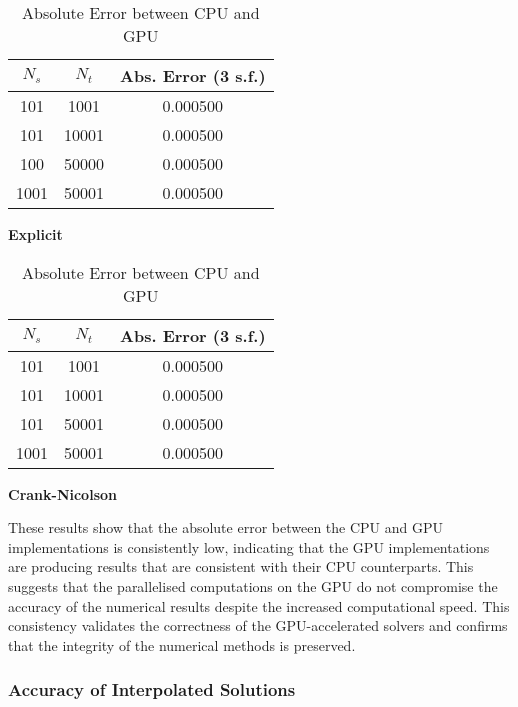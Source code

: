 \begin{table}[H]
    \centering
    \begin{minipage}{0.48\textwidth}
        \centering
        \begin{tabular}{ |c|c|c| }
            \hline
            \textbf{$N_s$} & \textbf{$N_t$} & \textbf{Abs. Error (3 s.f.)} \\ \hline
            101 & 1001 & 0.000500 \\ \hline
            101 & 10001 & 0.000500 \\ \hline
            100 & 50000 & 0.000500 \\ \hline
            1001 & 50001 & 0.000500 \\ \hline
        \end{tabular}
        \caption{\textbf{Explicit}}
        \label{tab:comparison-cpu-gpu-explicit}
    \end{minipage}
    \hfill
    \begin{minipage}{0.48\textwidth}
        \centering
        \begin{tabular}{ |c|c|c| }
            \hline
            \textbf{$N_s$} & \textbf{$N_t$} & \textbf{Abs. Error (3 s.f.)} \\ \hline
            101 & 1001 & 0.000500 \\ \hline
            101 & 10001 & 0.000500 \\ \hline
            101 & 50001 & 0.000500 \\ \hline
            1001 & 50001 & 0.000500 \\ \hline
        \end{tabular}
        \caption{\textbf{Crank-Nicolson}}
        \label{tab:comparison-cpu-gpu-cn}
    \end{minipage}
    \caption{Absolute Error between CPU and GPU}
    \label{tab:comparison-cpu-gpu}
\end{table}

These results show that the absolute error between the CPU and GPU implementations is consistently low, indicating that the GPU implementations are producing results that are consistent with their CPU counterparts. This suggests that the parallelised computations on the GPU do not compromise the accuracy of the numerical results despite the increased computational speed. This consistency validates the correctness of the GPU-accelerated solvers and confirms that the integrity of the numerical methods is preserved.

\subsubsection{Accuracy of Interpolated Solutions}

